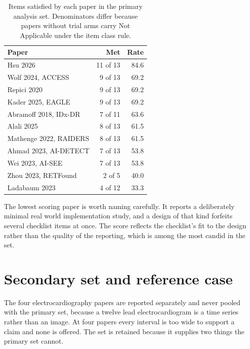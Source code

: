 \documentclass{article}
\begin{document}
\begin{table}[h]
  \caption{Items satisfied by each paper in the primary analysis set. Denominators differ because
  papers without trial arms carry Not Applicable under the item class rule.}
  \label{tab:paperscores}
  \centering
  \small
  \begin{tabular}{lrr}
    \toprule
    Paper & Met & Rate \\
    \midrule
    Hsu 2026 \cite{hsu2026}              & 11 of 13 & 84.6 \\
    Wolf 2024, ACCESS \cite{wolf2024}    & 9 of 13  & 69.2 \\
    Repici 2020 \cite{repici2020}        & 9 of 13  & 69.2 \\
    Kader 2025, EAGLE \cite{kader2025}   & 9 of 13  & 69.2 \\
    Abramoff 2018, IDx-DR \cite{abramoff2018} & 7 of 11 & 63.6 \\
    Alali 2025 \cite{alali2025}          & 8 of 13  & 61.5 \\
    Mathenge 2022, RAIDERS \cite{mathenge2022} & 8 of 13 & 61.5 \\
    Ahmad 2023, AI-DETECT \cite{ahmad2023} & 7 of 13 & 53.8 \\
    Wei 2023, AI-SEE \cite{wei2023}      & 7 of 13  & 53.8 \\
    Zhou 2023, RETFound \cite{zhou2023}  & 2 of 5   & 40.0 \\
    Ladabaum 2023 \cite{ladabaum2023}    & 4 of 12  & 33.3 \\
    \bottomrule
  \end{tabular}
\end{table}

The lowest scoring paper is worth naming carefully. It reports a deliberately minimal real world
implementation study, and a design of that kind forfeits several checklist items at once. The score
reflects the checklist's fit to the design rather than the quality of the reporting, which is among
the most candid in the set.

\section{Secondary set and reference case}
\label{app:secondary}

The four electrocardiography papers are reported separately and never pooled with the primary set,
because a twelve lead electrocardiogram is a time series rather than an image. At four papers every
interval is too wide to support a claim and none is offered. The set is retained because it supplies
two things the primary set cannot.
\end{document}
